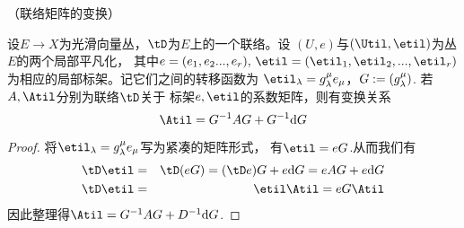 

\begin{prop}（联络矩阵的变换）

设$E\to X$为光滑向量丛，$\tD$为$E$上的一个联络。设
$(U,e)$与$(\Util,\etil)$为丛$E$的两个局部平凡化，
其中$e=(e_1,e_2...,e_r),\,\etil=(\etil_1,\etil_2,...,\etil_r)$
为相应的局部标架。记它们之间的转移函数为
$\etil_\lmd=g_\lmd^\mu e_\mu$，$G:=(g_\lambda^\mu)$.
若$A,\Atil$分别为联络$\tD$关于
标架$e,\etil$的系数矩阵，则有变换关系
$$
  \Atil
=
  G^{-1}AG+G^{-1}\td G
$$
\end{prop}

\begin{proof}
将$\etil_\lmd=g_\lmd^\mu e_\mu$写为紧凑的矩阵形式，
有$\etil=eG$.从而我们有
\begin{eqnarray*}
\tD\etil&=&\tD(eG)=(\tD e)G+e\td G=eAG+e\td G\\
\tD\etil&=&\etil\Atil=eG\Atil
\end{eqnarray*}
因此整理得$\Atil=G^{-1}AG+D^{-1}\td G$.
\end{proof}


